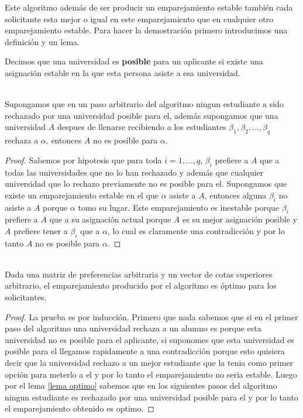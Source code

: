 Este algoritmo además de ser producir un emparejamiento estable también cada solicitante esta mejor o igual en este emparejamiento que en cualquier otro emparejamiento estable. Para hacer la demostración primero introducimos una definición y un lema. 

\begin{dfn}{\cite{GaleShapley}}
\label{Posible}
Decimos que una universidad es \textbf{posible} para un aplicante si existe una asignación estable en la que esta persona asiste a esa universidad.
\end{dfn}

\begin{lem} 
\label{lema optimo} 
\cite{GaleShapley} \\
Supongamos que en un paso arbitrario del algoritmo ningun estudiante a sido rechazado por una universidad posible para el, además supongamos que una universidad $A$ despues de llenarse recibiendo a los estudiantes $\beta_1,\beta_2,\dots,\beta_q$ rechaza a $\alpha$, entonces $A$ no es posible para $\alpha$.
\end{lem}
\begin{proof}
Sabemos por hipotesis que para toda $i=1,\dots,q$, $\beta_i$ prefiere a $A$ que a todas las universidades que no lo han rechazado y además que cualquier universidad que lo rechazo previamente no es posible para el. Supongamos que existe un emparejamiento estable en el que $\alpha$ asiste a $A$, entonces  alguna $\beta_i$ no asiste a $A$ porque $\alpha$ tomo su lugar. Este emparejamiento es inestable porque $\beta_i$ prefiere a $A$ que a su asignación actual porque $A$ es su mejor asignación posible y $A$ prefiere tener a $\beta_i$ que a $\alpha$, lo cual es claramente una contradicción y por lo tanto $A$ no es posible para $\alpha$.
\end{proof}

\begin{teo}
\cite{GaleShapley}  \\
Dada una matriz de preferencias arbitraria y un vector de cotas superiores arbitrario, el emparejamiento producido por el algoritmo es óptimo para los solicitantes.
\end{teo}
\begin{proof}
La prueba es por inducción. Primero que nada sabemos que si en el primer paso del algoritmo una universidad rechaza a un alumno es porque esta universidad no es posible para el aplicante, si suponomes que esta universidad es posible para el llegamos rapidamente a una contradicción porque esto quisiera decir que la universidad rechazo a un mejor estudiante que la tenia como primer opción para meterlo a el y por lo tanto el emparejamiento no seria estable. Luego por el lema \ref{lema optimo} sabemos que en los siguientes pasos del algoritmo ningun estudiante es rechazado por una universidad posible para el y por lo tanto el emparejamiento obtenido es optimo. 
\end{proof}


